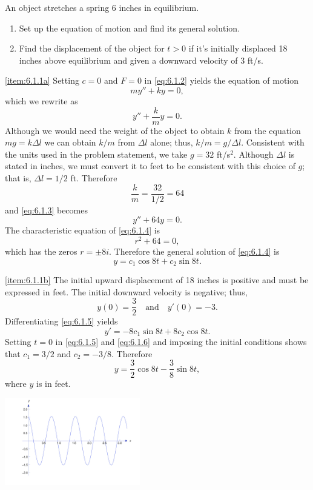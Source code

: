 \documentclass{ximera}
\begin{document}
\begin{example}\label{example:6.1.1}
An object stretches a spring 6 inches in equilibrium.
\begin{enumerate}
\item \label{item:6.1.1a} %
Set up the equation of motion and find its general solution.

\item \label{item:6.1.1b} %
Find the displacement of the object for $t>0$ if it's initially
displaced 18 inches above equilibrium and given a downward velocity of
3 ft/s.
\end{enumerate}


\begin{explanation}
\ref{item:6.1.1a}
Setting $c=0$ and $F=0$ in \eqref{eq:6.1.2} yields the equation of motion
$$
my''+ky=0,
$$
which we rewrite as
\begin{equation}\label{eq:6.1.3}
y''+\frac{k}{m}y=0.
\end{equation}
Although we would need the weight of the object to obtain $k$ from the
equation $mg=k\Delta l$ we can obtain $k/m$ from $\Delta l$ alone;
thus, $k/m=g/\Delta l$. Consistent with the units used in the problem
statement, we take $g=32$ ft/s$^2$. Although $\Delta l$ is stated in
inches, we must convert it to feet to be consistent with this choice
of $g$; that is, $\Delta l =1/2$ ft. Therefore
$$
\frac{k}{m}=\frac{32}{1/2}=64
$$
and \eqref{eq:6.1.3} becomes
\begin{equation}\label{eq:6.1.4}
y''+64y=0.
\end{equation}
 The characteristic equation of \eqref{eq:6.1.4} is
$$
r^2+64=0,
$$
which has the zeros $r=\pm 8i$. Therefore the general solution of
\eqref{eq:6.1.4} is
\begin{equation}\label{eq:6.1.5}
y=c_1\cos8t+c_2\sin8t.
\end{equation}

\ref{item:6.1.1b}
The initial upward displacement of 18 inches is positive and must be
expressed in feet. The initial downward velocity is negative;   thus,
$$
y(0)=\frac{3}{2}\quad\mbox{and}\quad y'(0)=-3.
$$
 Differentiating \eqref{eq:6.1.5} yields
\begin{equation}\label{eq:6.1.6}
y'=-8c_1\sin8t+8c_2\cos8t.
\end{equation}
Setting $t=0$ in \eqref{eq:6.1.5} and \eqref{eq:6.1.6} and imposing the
initial conditions shows that $c_1=3/2$ and $c_2=-3/8$. Therefore
$$
y=\frac{3}{2}\cos8t-\frac{3}{8}\sin8t,
$$
where $y$ is in feet.

\begin{image}
  \includegraphics[height=1.5in]{fig060104.jpg} 
\end{image}
\end{explanation}
\end{example}
\end{document}
